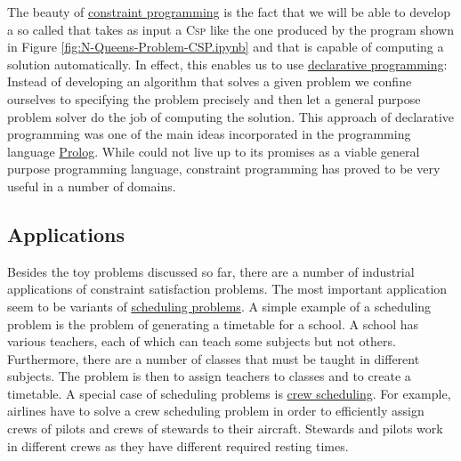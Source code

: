 The beauty of \href{https://en.wikipedia.org/wiki/Constraint_programming}{constraint programming} is the fact
that we will be able to develop a so called  that takes as input a \textsc{Csp}
like the one produced by the program shown in Figure \ref{fig:N-Queens-Problem-CSP.ipynb} and that is capable of
computing a solution automatically.  In effect, this enables us to use
\href{https://en.wikipedia.org/wiki/Declarative_programming}{declarative programming}:  Instead of developing
an algorithm that solves a given problem we confine ourselves to  specifying the problem precisely and then let a
general purpose problem solver do the job of computing the solution.  This approach of declarative programming 
was one of the main ideas incorporated in the programming language
\href{https://en.wikipedia.org/wiki/Prolog}{Prolog}.  While  could not live up to its promises
as a viable general purpose programming language, constraint programming has proved to be very useful in a
number of domains.  

\subsection{Applications}
Besides the toy problems discussed so far, there are a number of industrial applications of constraint
satisfaction problems.  The most important application seem to be variants of
\href{https://en.wikipedia.org/wiki/Scheduling_(production_processes)}{scheduling problems}. 
A simple example of a scheduling problem is the problem of generating a timetable for a school.  A school has
various teachers, each of which can teach some subjects but not others.  Furthermore, there are a number of
classes that must be taught in different subjects.  The problem is then to assign teachers to classes and to
create a timetable.  A special case of scheduling problems is
\href{https://en.wikipedia.org/wiki/Crew_scheduling}{crew scheduling}.  For example, airlines have to solve a
crew scheduling problem in order to efficiently assign crews of pilots and crews of stewards to their
aircraft.  Stewards and pilots work in different crews as they have different required resting times.

